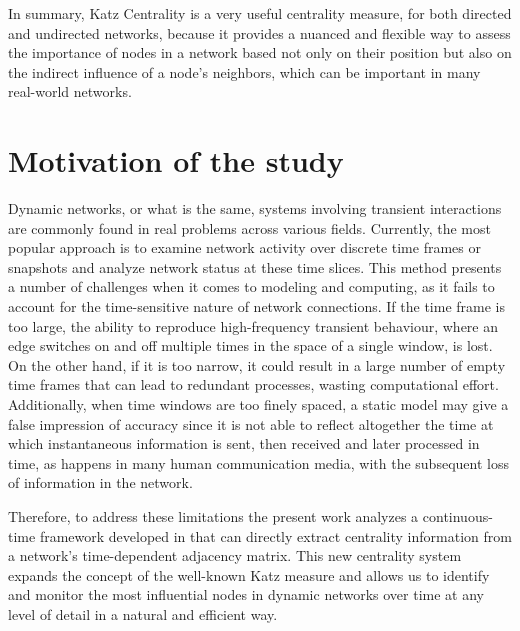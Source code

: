 In summary, Katz Centrality is a very useful centrality measure, for both directed and undirected networks, because it provides a nuanced and flexible way to assess the importance of nodes in a network based not only on their position but also on the indirect influence of a node's neighbors, which can be important in many real-world networks.

\newpage

\section{Motivation of the study}
\label{sec:motiv}
Dynamic networks, or what is the same, systems involving transient interactions are commonly found in real problems across various fields. Currently, the most popular approach is to examine network activity over discrete time frames or snapshots and analyze network status at these time slices. This method presents a number of challenges when it comes to modeling and computing, as it fails to account for the time-sensitive nature of network connections. If the time frame is too large, the ability to reproduce high-frequency transient behaviour, where an edge switches on and off multiple times in the space of a single window, is lost. On the other hand, if it is too narrow, it could result in a large number of empty time frames that can lead to redundant processes, wasting computational effort. Additionally, when time windows are too finely spaced, a static model may give a false impression of accuracy since it is not able to reflect altogether the time at which instantaneous information is sent, then received and later processed in time, as happens in many human communication media, with the subsequent loss of information in the network.

Therefore, to address these limitations the present work analyzes a continuous-time framework developed in \cite{grindrod2014dynamical} that can directly extract centrality information from a network's time-dependent adjacency matrix. This new centrality system expands the concept of the well-known Katz measure and allows us to identify and monitor the most influential nodes in dynamic networks over time at any level of detail in a natural and efficient way.

